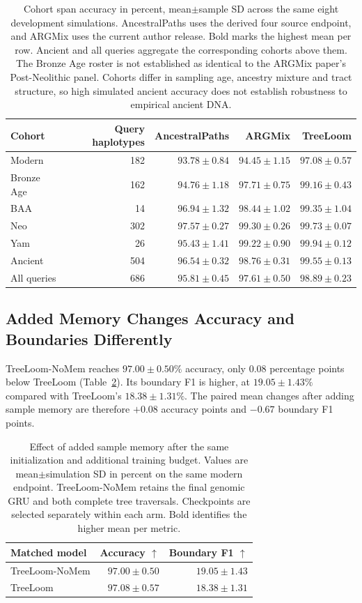 \documentclass[letterpaper]{article}
\newcommand{\best}[1]{\mathbf{#1}}
\begin{document}
\begin{table}[t]
\centering
\small
\begin{tabular}{@{}lrrrr@{}}
\toprule
Cohort & Query haplotypes & AncestralPaths & ARGMix & TreeLoom\\
\midrule
Modern &182&$93.78\pm0.84$&$94.45\pm1.15$&$\best{97.08\pm0.57}$\\
Bronze Age &162&$94.76\pm1.18$&$97.71\pm0.75$&$\best{99.16\pm0.43}$\\
BAA &14&$96.94\pm1.32$&$98.44\pm1.02$&$\best{99.35\pm1.04}$\\
Neo &302&$97.57\pm0.27$&$99.30\pm0.26$&$\best{99.73\pm0.07}$\\
Yam &26&$95.43\pm1.41$&$99.22\pm0.90$&$\best{99.94\pm0.12}$\\
Ancient &504&$96.54\pm0.32$&$98.76\pm0.31$&$\best{99.55\pm0.13}$\\
All queries &686&$95.81\pm0.45$&$97.61\pm0.50$&$\best{98.89\pm0.23}$\\
\bottomrule
\end{tabular}
\caption{Cohort span accuracy in percent, mean$\pm$sample SD across the same eight development simulations. AncestralPaths uses the derived four source endpoint, and ARGMix uses the current author release. Bold marks the highest mean per row. Ancient and all queries aggregate the corresponding cohorts above them. The Bronze Age roster is not established as identical to the ARGMix paper's Post-Neolithic panel. Cohorts differ in sampling age, ancestry mixture and tract structure, so high simulated ancient accuracy does not establish robustness to empirical ancient DNA.}
\label{tab:cohorts}
\end{table}

\subsection{Added Memory Changes Accuracy and Boundaries Differently}
TreeLoom-NoMem reaches $97.00\pm0.50\%$ accuracy, only 0.08 percentage points below TreeLoom (Table~\ref{tab:memory}). Its boundary F1 is higher, at $19.05\pm1.43\%$ compared with TreeLoom's $18.38\pm1.31\%$. The paired mean changes after adding sample memory are therefore $+0.08$ accuracy points and $-0.67$ boundary F1 points.

\begin{table}[t]
\centering
\small
\begin{tabular}{@{}lrr@{}}
\toprule
Matched model & Accuracy $\uparrow$ & Boundary F1 $\uparrow$\\
\midrule
TreeLoom-NoMem &$97.00\pm0.50$&$\best{19.05\pm1.43}$\\
TreeLoom &$\best{97.08\pm0.57}$&$18.38\pm1.31$\\
\bottomrule
\end{tabular}
\caption{Effect of added sample memory after the same initialization and additional training budget. Values are mean$\pm$simulation SD in percent on the same modern endpoint. TreeLoom-NoMem retains the final genomic GRU and both complete tree traversals. Checkpoints are selected separately within each arm. Bold identifies the higher mean per metric.}
\label{tab:memory}
\end{table}
\end{document}
